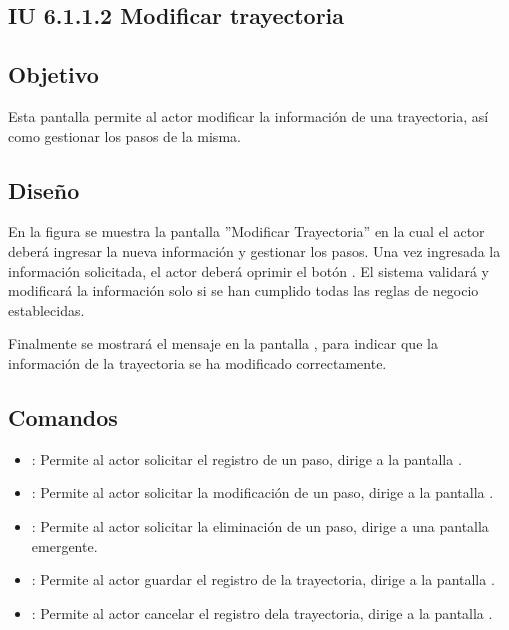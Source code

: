 \subsection{IU 6.1.1.2 Modificar trayectoria}

\subsection{Objetivo}
	Esta pantalla permite al actor modificar la información de una trayectoria, así como gestionar los pasos de la misma.
\subsection{Diseño}
	En la figura  se muestra la pantalla ''Modificar Trayectoria'' en la cual el actor deberá ingresar la nueva información y gestionar los pasos.
	Una vez ingresada la información solicitada, el actor deberá oprimir el botón  . El sistema validará y modificará la información solo si se han cumplido todas las reglas de negocio establecidas.
	
	Finalmente se mostrará el mensaje  en la pantalla , para indicar que la información de la trayectoria se ha modificado correctamente.

\subsection{Comandos}
\begin{itemize}
	\item {}: Permite al actor solicitar el registro de un paso, dirige a la pantalla .
	\item \editar [Modificar]: Permite al actor solicitar la modificación de un paso, dirige a la pantalla .
	\item \eliminar [Eliminar]: Permite al actor solicitar la eliminación de un paso, dirige a una pantalla emergente.
	\item {}: Permite al actor guardar el registro de la trayectoria, dirige a la pantalla .
	\item {}: Permite al actor cancelar el registro dela trayectoria, dirige a la pantalla .
\end{itemize}

